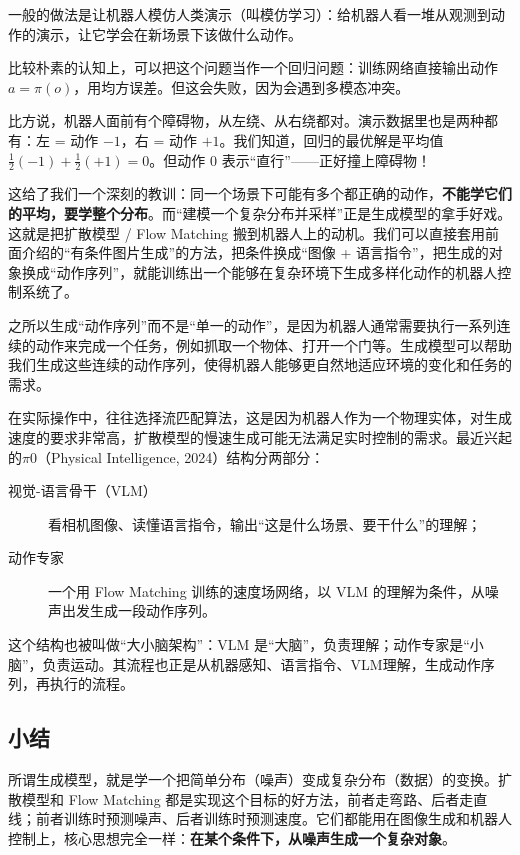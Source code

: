 一般的做法是让机器人模仿人类演示（叫模仿学习）：给机器人看一堆从观测到动作的演示，让它学会在新场景下该做什么动作。

比较朴素的认知上，可以把这个问题当作一个回归问题：训练网络直接输出动作 $a = \pi(o)$，用均方误差。但这会失败，因为会遇到多模态冲突。

比方说，机器人面前有个障碍物，从左绕、从右绕都对。演示数据里也是两种都有：左 = 动作 $-1$，右 = 动作 $+1$。我们知道，回归的最优解是平均值 $\frac{1}{2}(-1) + \frac{1}{2}(+1) = 0$。但动作 $0$ 表示“直行”——正好撞上障碍物！

这给了我们一个深刻的教训：同一个场景下可能有多个都正确的动作，\textbf{不能学它们的平均，要学整个分布}。而“建模一个复杂分布并采样”正是生成模型的拿手好戏。这就是把扩散模型 / Flow Matching 搬到机器人上的动机。我们可以直接套用前面介绍的“有条件图片生成”的方法，把条件换成“图像 + 语言指令”，把生成的对象换成“动作序列”，就能训练出一个能够在复杂环境下生成多样化动作的机器人控制系统了。

之所以生成“动作序列”而不是“单一的动作”，是因为机器人通常需要执行一系列连续的动作来完成一个任务，例如抓取一个物体、打开一个门等。生成模型可以帮助我们生成这些连续的动作序列，使得机器人能够更自然地适应环境的变化和任务的需求。

在实际操作中，往往选择流匹配算法，这是因为机器人作为一个物理实体，对生成速度的要求非常高，扩散模型的慢速生成可能无法满足实时控制的需求。最近兴起的$\pi$0（Physical Intelligence, 2024）结构分两部分：
\begin{description}
    \item[视觉-语言骨干（VLM）] 看相机图像、读懂语言指令，输出“这是什么场景、要干什么”的理解；
    \item[动作专家] 一个用 Flow Matching 训练的速度场网络，以 VLM 的理解为条件，从噪声出发生成一段动作序列。
\end{description}
这个结构也被叫做“大小脑架构”：VLM 是“大脑”，负责理解；动作专家是“小脑”，负责运动。其流程也正是从机器感知、语言指令、VLM理解，生成动作序列，再执行的流程。

\subsection{小结} 

所谓生成模型，就是学一个把简单分布（噪声）变成复杂分布（数据）的变换。扩散模型和 Flow Matching 都是实现这个目标的好方法，前者走弯路、后者走直线；前者训练时预测噪声、后者训练时预测速度。它们都能用在图像生成和机器人控制上，核心思想完全一样：\textbf{在某个条件下，从噪声生成一个复杂对象}。

